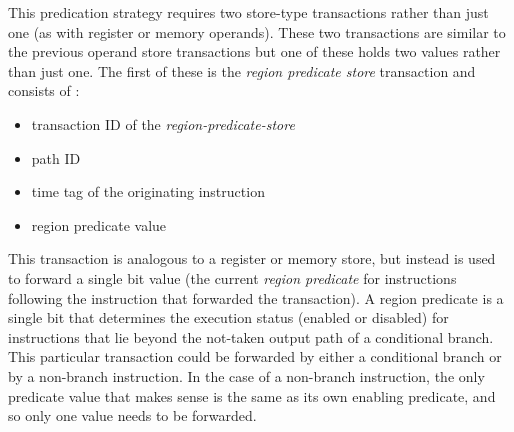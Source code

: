 This predication strategy requires two store-type transactions
rather than just one (as with register or memory operands).  
These two transactions are similar
to the previous operand store transactions 
but one of these holds two values rather than just one.
The first of these is the \textit{region predicate store}
transaction and consists of :
%
\begin{itemize}
\vspace{-0.10in}
\item{transaction ID of the \textit{region-predicate-store}}
\vspace{-0.10in}
\item{path ID}
\vspace{-0.10in}
\item{time tag of the originating instruction}
\vspace{-0.10in}
\item{region predicate value}
\vspace{-0.10in}
\end{itemize}   
%
This transaction is analogous to a register or memory
store, but instead is used to forward a single bit value (the
current \textit{region predicate} for instructions following the
instruction that forwarded the transaction).  A region predicate
is a single bit that determines the execution status
(enabled or disabled) for instructions that lie beyond the
not-taken output path of a conditional branch.
This particular transaction could be forwarded by either
a conditional branch or by a non-branch instruction.
In the
case of a non-branch instruction, the only
predicate value that makes sense is the same as its
own enabling predicate, and so only one value needs
to be forwarded.

